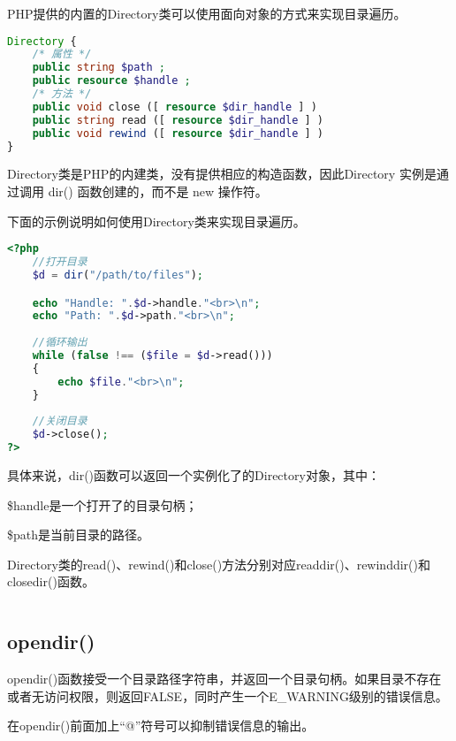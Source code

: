 PHP提供的内置的Directory类可以使用面向对象的方式来实现目录遍历。


\begin{lstlisting}[language=PHP]
Directory {
	/* 属性 */
	public string $path ;
	public resource $handle ;
	/* 方法 */
	public void close ([ resource $dir_handle ] )
	public string read ([ resource $dir_handle ] )
	public void rewind ([ resource $dir_handle ] )
}
\end{lstlisting}



Directory类是PHP的内建类，没有提供相应的构造函数，因此Directory 实例是通过调用 dir() 函数创建的，而不是 new 操作符。

下面的示例说明如何使用Directory类来实现目录遍历。

\begin{lstlisting}[language=PHP]
<?php
	//打开目录
	$d = dir("/path/to/files");

	echo "Handle: ".$d->handle."<br>\n";
	echo "Path: ".$d->path."<br>\n";
	
	//循环输出
	while (false !== ($file = $d->read()))
	{
	    echo $file."<br>\n";
	}
	
	//关闭目录
	$d->close();
?>
\end{lstlisting}


具体来说，dir()函数可以返回一个实例化了的Directory对象，其中：

\begin{compactitem}
\item \$handle是一个打开了的目录句柄；
\item \$path是当前目录的路径。
\end{compactitem}

Directory类的read()、rewind()和close()方法分别对应readdir()、rewinddir()和closedir()函数。

\begin{lstlisting}[language=PHP]

\end{lstlisting}




\subsection{opendir()}

opendir()函数接受一个目录路径字符串，并返回一个目录句柄。如果目录不存在或者无访问权限，则返回FALSE，同时产生一个E\_WARNING级别的错误信息。

在opendir()前面加上“@”符号可以抑制错误信息的输出。




